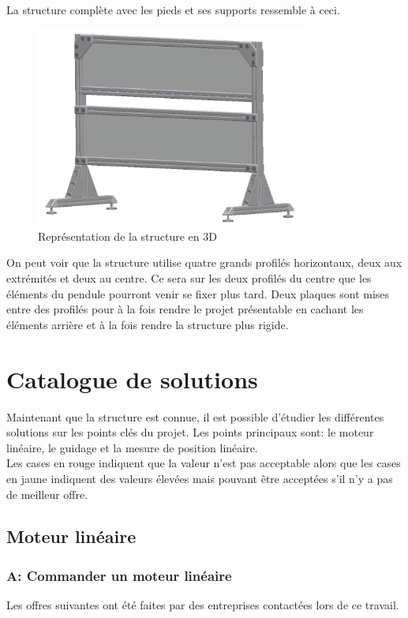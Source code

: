 La structure complète avec les pieds et ses supports ressemble à ceci.
\begin{figure}[H]
    \centering
    \includegraphics[width = 0.8\textwidth]{assets/figures/Structure.png}
    \caption{Représentation de la structure en 3D}
    \label{fig:DescStruct}
\end{figure}

On peut voir que la structure utilise quatre grands profilés horizontaux, deux aux extrémités et deux au centre. Ce sera sur les deux profilés du centre que
les éléments du pendule pourront venir se fixer plus tard. Deux plaques sont mises entre des profilés pour à la fois rendre le projet présentable
en cachant les éléments arrière et à la fois rendre la structure plus rigide.

\section{Catalogue de solutions}\label{sec:CatSol}
Maintenant que la structure est connue, il est possible d'étudier les différentes solutions sur les points clés du projet.
Les points principaux sont: le moteur linéaire, le guidage et la mesure de position linéaire.\\

Les cases en rouge indiquent que la valeur n'est pas acceptable alors que les cases en jaune indiquent des valeurs élevées mais pouvant être
acceptées s'il n'y a pas de meilleur offre.

\subsection{Moteur linéaire}
\subsubsection{A: Commander un moteur linéaire}
Les offres suivantes ont été faites par des entreprises contactées lors de ce travail.

